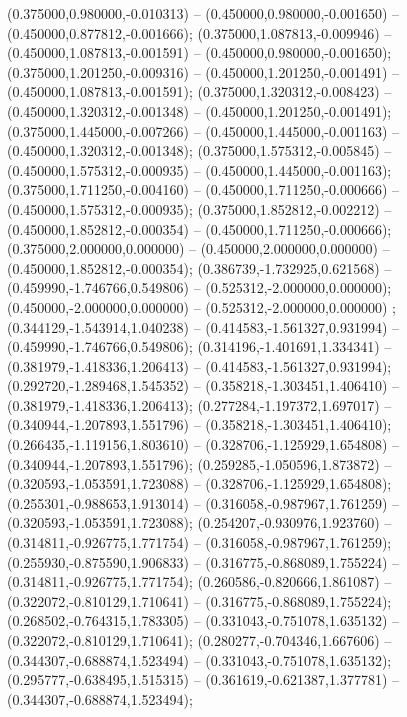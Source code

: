  (0.375000,0.980000,-0.010313) -- (0.450000,0.980000,-0.001650) -- (0.450000,0.877812,-0.001666);
 (0.375000,1.087813,-0.009946) -- (0.450000,1.087813,-0.001591) -- (0.450000,0.980000,-0.001650);
 (0.375000,1.201250,-0.009316) -- (0.450000,1.201250,-0.001491) -- (0.450000,1.087813,-0.001591);
 (0.375000,1.320312,-0.008423) -- (0.450000,1.320312,-0.001348) -- (0.450000,1.201250,-0.001491);
 (0.375000,1.445000,-0.007266) -- (0.450000,1.445000,-0.001163) -- (0.450000,1.320312,-0.001348);
 (0.375000,1.575312,-0.005845) -- (0.450000,1.575312,-0.000935) -- (0.450000,1.445000,-0.001163);
 (0.375000,1.711250,-0.004160) -- (0.450000,1.711250,-0.000666) -- (0.450000,1.575312,-0.000935);
 (0.375000,1.852812,-0.002212) -- (0.450000,1.852812,-0.000354) -- (0.450000,1.711250,-0.000666);
 (0.375000,2.000000,0.000000) -- (0.450000,2.000000,0.000000) -- (0.450000,1.852812,-0.000354);
 (0.386739,-1.732925,0.621568) -- (0.459990,-1.746766,0.549806) -- (0.525312,-2.000000,0.000000);
 (0.450000,-2.000000,0.000000) -- (0.525312,-2.000000,0.000000) ;
 (0.344129,-1.543914,1.040238) -- (0.414583,-1.561327,0.931994) -- (0.459990,-1.746766,0.549806);
 (0.314196,-1.401691,1.334341) -- (0.381979,-1.418336,1.206413) -- (0.414583,-1.561327,0.931994);
 (0.292720,-1.289468,1.545352) -- (0.358218,-1.303451,1.406410) -- (0.381979,-1.418336,1.206413);
 (0.277284,-1.197372,1.697017) -- (0.340944,-1.207893,1.551796) -- (0.358218,-1.303451,1.406410);
 (0.266435,-1.119156,1.803610) -- (0.328706,-1.125929,1.654808) -- (0.340944,-1.207893,1.551796);
 (0.259285,-1.050596,1.873872) -- (0.320593,-1.053591,1.723088) -- (0.328706,-1.125929,1.654808);
 (0.255301,-0.988653,1.913014) -- (0.316058,-0.987967,1.761259) -- (0.320593,-1.053591,1.723088);
 (0.254207,-0.930976,1.923760) -- (0.314811,-0.926775,1.771754) -- (0.316058,-0.987967,1.761259);
 (0.255930,-0.875590,1.906833) -- (0.316775,-0.868089,1.755224) -- (0.314811,-0.926775,1.771754);
 (0.260586,-0.820666,1.861087) -- (0.322072,-0.810129,1.710641) -- (0.316775,-0.868089,1.755224);
 (0.268502,-0.764315,1.783305) -- (0.331043,-0.751078,1.635132) -- (0.322072,-0.810129,1.710641);
 (0.280277,-0.704346,1.667606) -- (0.344307,-0.688874,1.523494) -- (0.331043,-0.751078,1.635132);
 (0.295777,-0.638495,1.515315) -- (0.361619,-0.621387,1.377781) -- (0.344307,-0.688874,1.523494);
